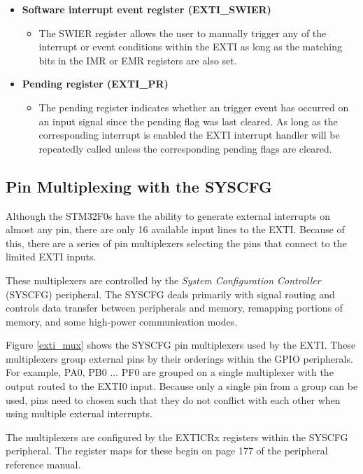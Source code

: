 \documentclass[11pt,fleqn]{book} %
\begin{document}
\begin{itemize}
    \item \textbf{Software interrupt event register (EXTI\_SWIER)}
    \begin{itemize}
        \item The SWIER register allows the user to manually trigger any of the interrupt or event conditions within the EXTI as long as the matching bits in the IMR or EMR registers are also set. 
    \end{itemize}
    \item \textbf{Pending register (EXTI\_PR)}
    \begin{itemize}
        \item  The pending register indicates whether an trigger event has occurred on an input signal since the pending flag was last cleared. As long as the corresponding interrupt is enabled the EXTI interrupt handler will be repeatedly called unless the corresponding pending flags are cleared. 
    \end{itemize}
\end{itemize}



\subsection{Pin Multiplexing with the SYSCFG} \label{syscfg}
Although the STM32F0s have the ability to generate external interrupts on almost any pin, there are only 16 available input lines to the EXTI. Because of this, there are a series of pin multiplexers selecting the pins that connect to the limited EXTI inputs.  

These multiplexers are controlled by the \textit{System Configuration Controller} (SYSCFG) peripheral. The SYSCFG deals primarily with signal routing and controls data transfer between peripherals and memory, remapping portions of memory, and some high-power communication modes. 

Figure \ref{exti_mux} shows the SYSCFG pin multiplexers used by the EXTI. These multiplexers group external pins by their orderings within the GPIO peripherals. For example, PA0, PB0 ... PF0 are grouped on a single multiplexer with the output routed to the EXTI0 input. Because only a single pin from a group can be used, pins need to chosen such that they do not conflict with each other when using multiple external interrupts.

The multiplexers are configured by the EXTICRx registers within the SYSCFG peripheral. The register maps for these begin on page 177 of the peripheral reference manual. 
\end{document}
